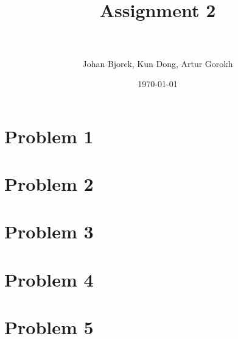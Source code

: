 \documentclass[paper=a4, fontsize=10pt]{scrartcl} %
\title{ 
\normalfont \normalsize
\horrule{0.5pt} \\[0.2cm] %
\huge Assignment 2 \\ %
\horrule{1pt} \\[0.2cm] %
}
\author{Johan Bjorck, Kun Dong, Artur Gorokh} %
\date{\normalsize\today} %
\numberwithin{equation}{section} %
\numberwithin{figure}{section} %
\numberwithin{table}{section} %
\begin{document}
\maketitle %

\section*{Problem 1}

\section*{Problem 2}

\section*{Problem 3}

\section*{Problem 4}

\section*{Problem 5}

\end{document}
